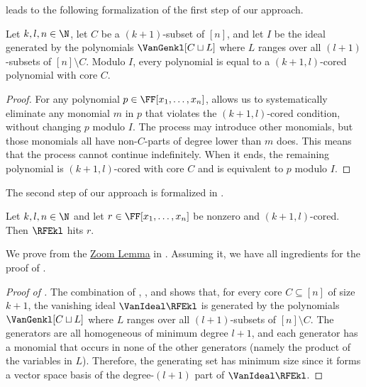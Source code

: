 \documentclass{toc}
\begin{document}
 leads to the following formalization of the first step of our approach.

\begin{lemma}
  \label{lem.vangen-coredform}
  Let \(k,l,n\in\N\),
  let \(C\) be a \((k+1)\)-subset of \([n]\), and
  let $I$ be the ideal generated by the
  polynomials \(\VanGenkl[C \sqcup L]\)
  where \(L\) ranges over all \((l+1)\)-subsets of \([n] \setminus C\).
  Modulo $I$,
  every polynomial is equal
  to a \((k+1,l)\)-cored polynomial with core \(C\).
\end{lemma}

\begin{proof}
For any polynomial $p \in \FF[x_1,\dots,x_n]$,  allows us to 
systematically eliminate any monomial $m$ in \(p\) that violates the \((k+1,l)\)-cored condition, without changing $p$ modulo $I$. The process may introduce other monomials, but those monomials all have non-$C$-parts of degree lower than $m$ does. This means that the process cannot continue indefinitely. When it ends, the remaining polynomial is \((k+1,l)\)-cored with core \(C\) and is equivalent to $p$ modulo $I$. 
\end{proof}

The second step of our approach is formalized in .

\begin{lemma}
  \label{lem.rfe-hits-cored}
  Let \(k,l,n\in\N\) and let $r \in \FF[x_1,\dots,x_n]$ be nonzero and \((k+1,l)\)-cored.
  Then \(\RFEkl\) hits \(r\).
\end{lemma}

We prove  from the \hyperref[lem.multi-zsub-deriv]{Zoom Lemma} in . Assuming it, we have all ingredients for the proof of . 

\begin{proof}[Proof of ]
The combination of ,
, and  shows that,
for every core $C \subseteq [n]$ of size $k+1$, the vanishing ideal \(\VanIdeal\RFEkl\) is generated by the
polynomials \(\VanGenkl[C \sqcup L]\) where \(L\) ranges over all \((l+1)\)-subsets of \([n] \setminus C\). The generators are all homogeneous of minimum degree \(l+1\), and each generator has a monomial that occurs in none of the other generators (namely the product of the variables in $L$). Therefore, the generating set has minimum size
since it forms a vector space basis of the degree-\((l+1)\) part of \(\VanIdeal\RFEkl\).
\end{proof}
\end{document}
